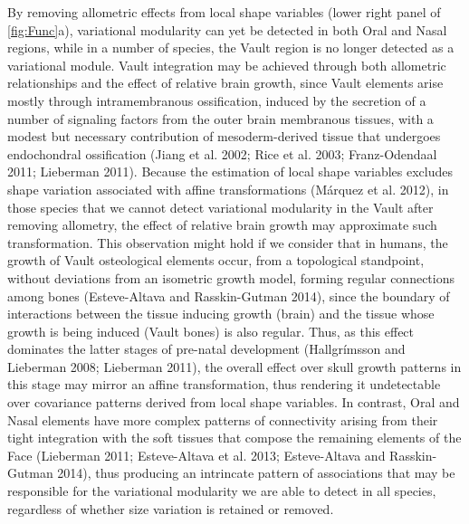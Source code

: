 \documentclass[12pt,]{article}
\begin{document}
By removing allometric effects from local shape variables (lower right
panel of \autoref{fig:Func}a), variational modularity can yet be
detected in both Oral and Nasal regions, while in a number of species,
the Vault region is no longer detected as a variational module. Vault
integration may be achieved through both allometric relationships and
the effect of relative brain growth, since Vault elements arise mostly
through intramembranous ossification, induced by the secretion of a
number of signaling factors from the outer brain membranous tissues,
with a modest but necessary contribution of mesoderm-derived tissue that
undergoes endochondral ossification (Jiang et al. 2002; Rice et al.
2003; Franz-Odendaal 2011; Lieberman 2011). Because the estimation of
local shape variables excludes shape variation associated with affine
transformations (Márquez et al. 2012), in those species that we cannot
detect variational modularity in the Vault after removing allometry, the
effect of relative brain growth may approximate such transformation.
This observation might hold if we consider that in humans, the growth of
Vault osteological elements occur, from a topological standpoint,
without deviations from an isometric growth model, forming regular
connections among bones (Esteve-Altava and Rasskin-Gutman 2014), since
the boundary of interactions between the tissue inducing growth (brain)
and the tissue whose growth is being induced (Vault bones) is also
regular. Thus, as this effect dominates the latter stages of pre-natal
development (Hallgrímsson and Lieberman 2008; Lieberman 2011), the
overall effect over skull growth patterns in this stage may mirror an
affine transformation, thus rendering it undetectable over covariance
patterns derived from local shape variables. In contrast, Oral and Nasal
elements have more complex patterns of connectivity arising from their
tight integration with the soft tissues that compose the remaining
elements of the Face (Lieberman 2011; Esteve-Altava et al. 2013;
Esteve-Altava and Rasskin-Gutman 2014), thus producing an intrincate
pattern of associations that may be responsible for the variational
modularity we are able to detect in all species, regardless of whether
size variation is retained or removed.
\end{document}
